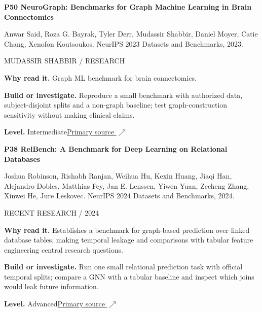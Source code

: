 \documentclass[11pt,letterpaper]{article}
\begin{document}
\begin{minipage}{\linewidth}
{\large\bfseries P50 NeuroGraph: Benchmarks for Graph Machine Learning in Brain Connectomics}\par
Anwar Said, Roza G. Bayrak, Tyler Derr, Mudassir Shabbir, Daniel Moyer, Catie Chang, Xenofon Koutsoukos. NeurIPS 2023 Datasets and Benchmarks, 2023.\par
\textcolor{ink}{\small MUDASSIR SHABBIR / RESEARCH}\par
\textbf{Why read it.} Graph ML benchmark for brain connectomics.\par
\textbf{Build or investigate.} Reproduce a small benchmark with authorized data, subject-disjoint splits and a non-graph baseline; test graph-construction sensitivity without making clinical claims.\par
\textbf{Level.} Intermediate\quad\href{https://arxiv.org/abs/2306.06202}{Primary source $\nearrow$}\par
\end{minipage}\par\vspace{10pt}
\begin{minipage}{\linewidth}
{\large\bfseries P38 RelBench: A Benchmark for Deep Learning on Relational Databases}\par
Joshua Robinson, Rishabh Ranjan, Weihua Hu, Kexin Huang, Jiaqi Han, Alejandro Dobles, Matthias Fey, Jan E. Lenssen, Yiwen Yuan, Zecheng Zhang, Xinwei He, Jure Leskovec. NeurIPS 2024 Datasets and Benchmarks, 2024.\par
\textcolor{ink}{\small RECENT RESEARCH / 2024}\par
\textbf{Why read it.} Establishes a benchmark for graph-based prediction over linked database tables, making temporal leakage and comparisons with tabular feature engineering central research questions.\par
\textbf{Build or investigate.} Run one small relational prediction task with official temporal splits; compare a GNN with a tabular baseline and inspect which joins would leak future information.\par
\textbf{Level.} Advanced\quad\href{https://papers.nips.cc/paper_files/paper/2024/hash/25cd345233c65fac1fec0ce61d0f7836-Abstract-Datasets_and_Benchmarks_Track.html}{Primary source $\nearrow$}\par
\end{minipage}\par\vspace{10pt}
\end{document}
